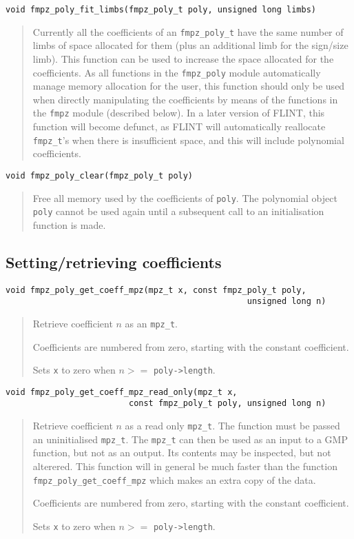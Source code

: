 \documentclass[a4paper,10pt]{article}
\newcommand{\code}{\lstinline}
\begin{document}
\begin{lstlisting}
void fmpz_poly_fit_limbs(fmpz_poly_t poly, unsigned long limbs)
\end{lstlisting}
\begin{quote}
Currently all the coefficients of an \code{fmpz_poly_t} have the same number of limbs of space allocated for them (plus an additional limb for the sign/size limb). This function can be used to increase the space allocated for the coefficients. As all functions in the \code{fmpz_poly} module automatically manage memory allocation for the user, this function should only be used when directly manipulating the coefficients by means of the functions in the \code{fmpz} module (described below). In a later version of FLINT, this function will become defunct, as FLINT will automatically reallocate \code{fmpz_t}'s when there is insufficient space, and this will include polynomial coefficients.
\end{quote}

\begin{lstlisting}
void fmpz_poly_clear(fmpz_poly_t poly)\end{lstlisting}
\begin{quote}
Free all memory used by the coefficients of \code{poly}. The polynomial object \code{poly} cannot be used again until a subsequent call to an initialisation function is made.
\end{quote}

\subsection{Setting/retrieving coefficients}

\begin{lstlisting}
void fmpz_poly_get_coeff_mpz(mpz_t x, const fmpz_poly_t poly, 
                                                 unsigned long n)
\end{lstlisting}
\begin{quote}
Retrieve coefficient $n$ as an \code{mpz_t}. 

Coefficients are numbered from zero, starting with the constant coefficient.

Sets \code{x} to zero when $n >= $ \code{poly->length}. 
\end{quote}

\begin{lstlisting}
void fmpz_poly_get_coeff_mpz_read_only(mpz_t x, 
                         const fmpz_poly_t poly, unsigned long n)
\end{lstlisting}
\begin{quote}
Retrieve coefficient $n$ as a read only \code{mpz_t}. The function must be passed an uninitialised \code{mpz_t}. The \code{mpz_t} can then be used as an input to a GMP function, but not as an output. Its contents may be inspected, but not alterered. This function will in general be much faster than the function \code{fmpz_poly_get_coeff_mpz} which makes an extra copy of the data. 

Coefficients are numbered from zero, starting with the constant coefficient.

Sets \code{x} to zero when $n >= $ \code{poly->length}. 
\end{quote}
\end{document}
